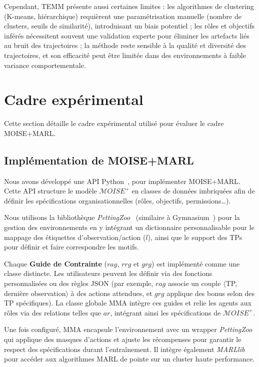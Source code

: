 \documentclass[francais,ROIA,Unicode,manuscript]{cedram}
\begin{document}
Cependant, TEMM présente aussi certaines limites : les algorithmes de clustering (K-means, hiérarchique) requièrent une paramétrisation manuelle (nombre de clusters, seuils de similarité), introduisant un biais potentiel ; les rôles et objectifs inférés nécessitent souvent une validation experte pour éliminer les artefacts liés au bruit des trajectoires ; la méthode reste sensible à la qualité et diversité des trajectoires, et son efficacité peut être limitée dans des environnements à faible variance comportementale.


\section{Cadre expérimental}
\label{sec:experimental_setup}

Cette section détaille le cadre expérimental utilisé pour évaluer le cadre MOISE+MARL.


\subsection{Implémentation de MOISE+MARL}

Nous avons développé une API Python~\hyperref[fn:github]{\footnotemark[1]}, pour implémenter MOISE+MARL. Cette API structure le modèle \(\mathcal{M}OISE^+\) en classes de données imbriquées afin de définir les spécifications organisationnelles (rôles, objectifs, permissions\dots).

Nous utilisons la bibliothèque \textit{PettingZoo}~\cite{terry2020pettingzoo} (similaire à Gymnasium~\cite{kwiatkowski2024}) pour la gestion des environnements en y intégrant un dictionnaire personnalisable pour le mappage des étiquettes d'observation/action (\(l\)), ainsi que le support des TPs pour définir et faire correspondre les motifs.

Chaque \textbf{Guide de Contrainte} (\(rag\), \(rrg\) et \(grg\)) est implémenté comme une classe distincte. Les utilisateurs peuvent les définir via des fonctions personnalisées ou des règles JSON (par exemple, \(rag\) associe un couple \(\langle\)TP, dernière observation\(\rangle\) à des actions attendues, et \(grg\) applique des bonus selon des TP spécifiques). La classe globale MMA intègre ces guides et relie les agents aux rôles via des relations telles que \(ar\), intégrant ainsi les spécifications de \(\mathcal{M}OISE^+\).

Une fois configuré, MMA encapsule l'environnement avec un wrapper \textit{PettingZoo} qui applique des masques d'actions et ajuste les récompenses pour garantir le respect des spécifications durant l'entraînement. Il intègre également \textit{MARLlib}~\cite{hu2021marlib} pour accéder aux algorithmes MARL de pointe sur un cluster haute performance.
\end{document}
